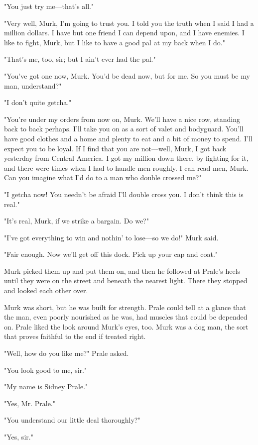 \documentclass{novel}
\begin{document}
"You just try me---that's all."

"Very well, Murk, I'm going to trust you. I told you the truth when I said I had a million dollars. I have but one friend I can depend upon, and I have enemies. I like to fight, Murk, but I like to have a good pal at my back when I do."

"That's me, too, sir; but I ain't ever had the pal."

"You've got one now, Murk. You'd be dead now, but for me. So you must be my man, understand?"

"I don't quite getcha."

"You're under my orders from now on, Murk. We'll have a nice row, standing back to back perhaps. I'll take you on as a sort of valet and bodyguard. You'll have good clothes and a home and plenty to eat and a bit of money to spend. I'll expect you to be loyal. If I find that you are not---well, Murk, I got back yesterday from Central America. I got my million down there, by fighting for it, and there were times when I had to handle men roughly. I can read men, Murk. Can you imagine what I'd do to a man who double crossed me?"

"I getcha now! You needn't be afraid I'll double cross you. I don't think this is real."

"It's real, Murk, if we strike a bargain. Do we?"

"I've got everything to win and nothin' to lose---so we do!" Murk said.

"Fair enough. Now we'll get off this dock. Pick up your cap and coat."

Murk picked them up and put them on, and then he followed at Prale's heels until they were on the street and beneath the nearest light. There they stopped and looked each other over.

Murk was short, but he was built for strength. Prale could tell at a glance that the man, even poorly nourished as he was, had muscles that could be depended on. Prale liked the look around Murk's eyes, too. Murk was a dog man, the sort that proves faithful to the end if treated right.

"Well, how do you like me?" Prale asked.

"You look good to me, sir."

"My name is Sidney Prale."

"Yes, Mr. Prale."

"You understand our little deal thoroughly?"

"Yes, sir."
\end{document}
